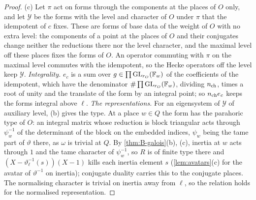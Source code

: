 \begin{proof}
(c) Let $\pi$ act on forms through the components at the places of $O$ only, and let $\mathcal Y$ be the forms with the level and character of $O$ under $\pi$ that the idempotent of $c$ fixes. These are forms of base data of the weight of
$O$ with no extra level: the components of a point at the places of $O$ and their conjugates change neither the reductions there nor the level character, and the maximal level off these places fixes the forms of $O$.
An operator commuting with $\pi$ on the maximal level commutes with the idempotent, so the Hecke operators off the level keep $\mathcal Y$. \emph{Integrality.} $e_c$ is a sum over $g\in\prod\operatorname{GL}_{r_O}(\mathbb{F}_w)$ of the coefficients of the idempotent,
which have the denominator $\#\prod\operatorname{GL}_{r_O}(\mathbb{F}_w)$, dividing $n_{\rm ch}$, times a root of unity and the translate of the form by an integral point; so $n_{\rm ch}e_c$ keeps the forms integral above $\ell$. \emph{The representations.}
For an eigensystem of $\mathcal Y$ of auxiliary level, (b) gives the type. At a place $w\in Q$ the form has the parahoric type of $O$: an integral matrix whose reduction is block triangular acts through $\psi_w^{-1}$ of the determinant of
the block on the embedded indices, $\psi_w$ being the tame part of $\vartheta$ there, as $\omega$ is trivial at $Q$. By \cref{thm:B-galois}(b), (c), inertia at $w$ acts through $1$ and the tame character of $\psi_w^{-1}$, so $R$ is of
finite type there and $(X-\vartheta_\ell^{-1}(s))(X-1)$ kills each inertia element $s$ (\cref{lem:avatars}(c) for the avatar of $\vartheta^{-1}$ on inertia); conjugate duality carries this to the conjugate places. The normalising
character is trivial on inertia away from $\ell$, so the relation holds for the normalised representation.
\end{proof}

